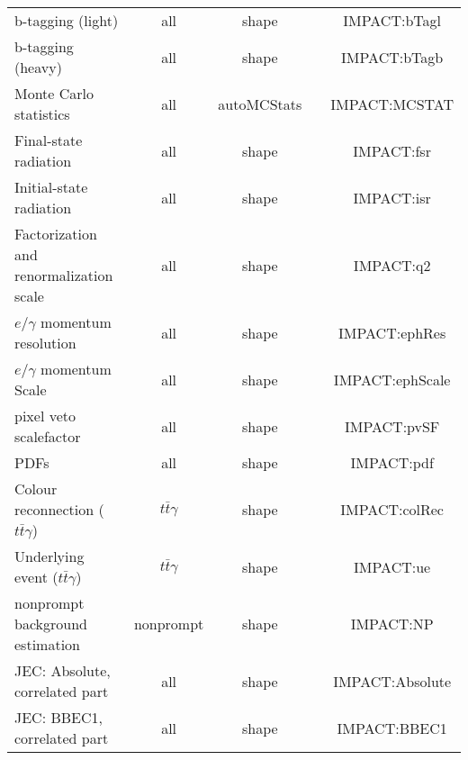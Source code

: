 \begin{table}
\begin{tabular}{l|c|c|c|c}
      b-tagging (light)                                   & all                   & shape             &                & IMPACT:bTagl  \\
      b-tagging (heavy)                                   & all                   & shape             &                & IMPACT:bTagb  \\
      Monte Carlo statistics                              & all                   & autoMCStats       &                & IMPACT:MCSTAT  \\
      Final-state radiation                               & all                   & shape             &                & IMPACT:fsr  \\
      Initial-state radiation                             & all                   & shape             &                & IMPACT:isr  \\
      Factorization and renormalization scale             & all                   & shape             &                & IMPACT:q2  \\
      $e/\gamma$ momentum resolution                      & all                   & shape             &                & IMPACT:ephRes  \\
      $e/\gamma$ momentum Scale                           & all                   & shape             &                & IMPACT:ephScale  \\
      pixel veto scalefactor                              & all                   & shape             &                & IMPACT:pvSF  \\
      PDFs                                                & all                   & shape             &                & IMPACT:pdf  \\
      Colour reconnection ($t\bar{t}\gamma$)              & $t\bar{t}\gamma$      & shape             &                & IMPACT:colRec  \\
      Underlying event ($t\bar{t}\gamma$)                 & $t\bar{t}\gamma$      & shape             &                & IMPACT:ue  \\
      nonprompt background estimation                     & nonprompt             & shape             &                & IMPACT:NP  \\
      JEC: Absolute, correlated part                      & all                   & shape             &                & IMPACT:Absolute  \\
      JEC: BBEC1, correlated part                         & all                   & shape             &                & IMPACT:BBEC1  \\

\end{tabular}
\end{table}
